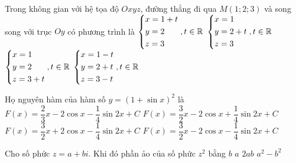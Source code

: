 \begin{ex}%
	Trong không gian với hệ tọa độ $Oxyz$, đường thẳng đi qua $M(1;2;3)$ và song song với trục $Oy$ có phương trình là
	\choice
	{$\left\{\begin{aligned}&x=1+t \\ &y=2 \\ &z=3\end{aligned}\right., t\in \mathbb{R}$}
	{\True $\left\{\begin{aligned}&x=1 \\ &y=2+t \\ &z=3\end{aligned}\right., t\in \mathbb{R}$}
	{$\left\{\begin{aligned}&x=1 \\ &y=2 \\ &z=3+t\end{aligned}\right., t\in \mathbb{R}$}
	{$\left\{\begin{aligned}&x=1-t \\ &y=2+t \\ &z=3-t\end{aligned}\right., t\in \mathbb{R}$}
\end{ex}

\begin{ex}%
	Họ nguyên hàm của hàm số $y=(1+\sin x)^2$ là
	\choice
	{$F(x)= \dfrac{2}{3}x-  2 \cos x -\dfrac{1}{4} \sin 2x +C$}
	{$F(x)=\dfrac{3}{2}x - 2 \cos x +\dfrac{1}{4} \sin 2x +C$}
	{$F(x)=\dfrac{3}{2}x +2 \cos x -\dfrac{1}{4} \sin 2x +C$}
	{\True $F(x)=\dfrac{3}{2}x -2 \cos x -\dfrac{1}{4} \sin 2x +C$}
\end{ex}

\begin{ex}%
	Cho số phức $z=a+bi$. Khi đó phần ảo của số phức $z^2$ bằng
	\choice
	{$b$}
	{$a$}
	{\True $2ab$}
	{$a^2-b^2$}
\end{ex}

